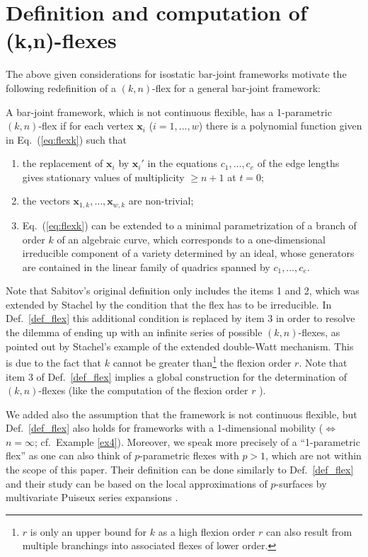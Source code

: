 \documentclass{svproc}
\def\Vkt#1{{\mathbf #1}}
\begin{document}
\section{Definition and computation of (k,n)-flexes}\label{sec:defcomp}

The above given considerations for isostatic bar-joint frameworks motivate the following redefinition of a $(k,n)$-flex for a general 
bar-joint framework:


\begin{definition} \label{def_flex}
A bar-joint framework, which is not continuous flexible, has a 1-parametric $(k,n)$-flex if for each vertex $\Vkt x_i$ ($i=1,\ldots,w$) 
there is a polynomial function given in Eq.\ (\ref{eq:flexk})
such that
\begin{enumerate}
\item
the replacement of $\Vkt x_i$ by $\Vkt x_i'$ in the equations $c_1,\ldots,c_e$ of the edge lengths gives stationary values 
of multiplicity $\geq n+1$ at $t=0$;
\item
the vectors $\Vkt x_{1,k},\ldots ,\Vkt x_{w,k}$ are non-trivial; 
\item
Eq.\ (\ref{eq:flexk}) can be extended to a minimal parametrization of a branch of order $k$ of an algebraic curve, 
which corresponds to a one-dimensional irreducible component of a variety determined by an ideal, whose
generators  
are contained in the linear 
family of quadrics spanned by $c_1,\ldots, c_e$.
\end{enumerate}
\end{definition}
Note that Sabitov's original definition \cite[page 230]{sabitov} only includes the items 1 and 2, which was extended by Stachel by the condition that the flex has to be irreducible. 
In Def.\ \ref{def_flex} this additional condition is replaced by item 3 in order to resolve the dilemma of  ending up with an infinite series of possible 
$(k,n)$-flexes, as pointed out by Stachel's example of the extended double-Watt mechanism. 
This is due to the fact that $k$ cannot be greater than\footnote{$r$ is only an upper bound for $k$ as a high flexion order $r$ can also result from multiple branchings into associated flexes of lower order.} the flexion order $r$. 
Note that item 3 of  Def.\ \ref{def_flex} implies a 
global construction for the determination of $(k,n)$-flexes (like the computation of the flexion order $r$ \cite{MMT}).




We added also the assumption that the framework 
is not continuous flexible, 
but Def.\ \ref{def_flex}  also holds for frameworks with a 1-dimensional mobility ($\Leftrightarrow$ $n=\infty$; cf.\ Example \ref{ex4}). 
Moreover, we speak more precisely of a ``1-parametric flex'' as one can also think of $p$-parametric flexes with $p>1$, which are not within the scope of this paper. Their definition can be done similarly to Def.\  \ref{def_flex} and their study can be based on the local approximations of $p$-surfaces by multivariate Puiseux series expansions \cite{aroca,buchacher,mc1,mc2}.
\end{document}
